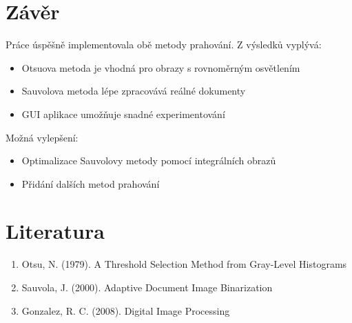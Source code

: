 \documentclass[12pt,a4paper]{article}
\begin{document}
\section{Závěr}
Práce úspěšně implementovala obě metody prahování. Z výsledků vyplývá:
\begin{itemize}
\item Otsuova metoda je vhodná pro obrazy s rovnoměrným osvětlením
\item Sauvolova metoda lépe zpracovává reálné dokumenty
\item GUI aplikace umožňuje snadné experimentování
\end{itemize}

Možná vylepšení:
\begin{itemize}
\item Optimalizace Sauvolovy metody pomocí integrálních obrazů
\item Přidání dalších metod prahování
\end{itemize}

\section*{Literatura}
\begin{enumerate}
\item Otsu, N. (1979). A Threshold Selection Method from Gray-Level Histograms
\item Sauvola, J. (2000). Adaptive Document Image Binarization
\item Gonzalez, R. C. (2008). Digital Image Processing
\end{enumerate}
\end{document}

